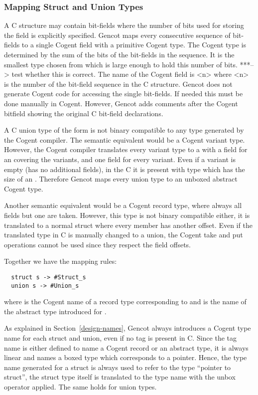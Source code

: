 \subsubsection{Mapping Struct and Union Types}
A C structure may contain bit-fields where the number of bits used for storing the field is explicitly specified.
Gencot maps every consecutive sequence of bit-fields to a single Cogent field with a primitive Cogent type.
The Cogent type is determined by the sum of the bits of the bit-fields in the sequence. It is the smallest 
type chosen from  which is large enough to hold this number of bits. 
***--> test whether this is correct.
The name of the
Cogent field is <n> where <n> is the number of the bit-field sequence in the C structure.
Gencot does not generate Cogent code for accessing the single bit-fields. If needed this must be done manually in Cogent.
However, Gencot adds comments after the Cogent bitfield showing the original C bit-field declarations.

A C union type of the form  is not binary compatible to any type generated by the Cogent compiler.
The semantic equivalent would be a Cogent variant type. However, the Cogent compiler translates every variant type
to a  with a field for an  covering the variants, and one field for every variant. Even if a variant
is empty (has no additional fields), in the C  it is present with type  which
has the size of an . Therefore Gencot maps every union type to an unboxed abstract Cogent type.

Another semantic equivalent would be a Cogent record type, where always all fields but one are taken. However,
this type is not binary compatible either, it is translated to a normal struct where every member has another
offset. Even if the translated type in C is manually changed to a union, the Cogent take and put operations cannot
be used since they respect the field offsets. 

Together we have the mapping rules:
\begin{verbatim}
  struct s -> #Struct_s
  union s -> #Union_s
\end{verbatim}
where  is the Cogent name of a record type corresponding to  and  is the
name of the abstract type introduced for .

As explained in Section~\ref{design-names}, Gencot always introduces a Cogent type name for each struct and union,
even if no tag is present in C. Since the tag name is either defined to name a Cogent record or an abstract type,
it is always linear and names a boxed type which corresponds to a pointer. Hence, the type name generated for a struct
is always used to refer to the type ``pointer to struct'', the struct type itself is translated to the type name 
with the unbox operator applied. The same holds for union types.

